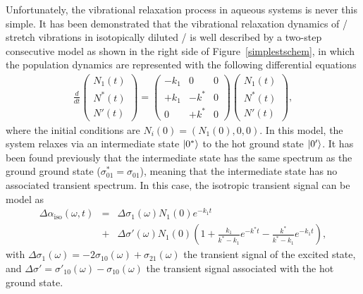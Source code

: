 Unfortunately, the vibrational relaxation process in aqueous systems is never this simple. It has been demonstrated that the vibrational relaxation dynamics of / stretch vibrations in isotopically diluted / is well described by a two-step consecutive model as shown in the right side of Figure~\ref{simplestschem},\!\cite{Rezus2005,Rezus2006} in which the population dynamics are represented with the following differential equations
\begin{eqnarray}
\frac{d}{d t} \left( \begin{array}{c} N_1 (t)\\ N^* (t) \\ N' (t) \end{array} \right) = \left( \begin{array}{ccc} -k_1 & 0 & 0 \\ +k_1 & -k^* & 0 \\ 0 & +k^* & 0 \end{array} \right)  \left( \begin{array}{c} N_1 (t) \\ N^* (t) \\ N' (t) \end{array} \right),
\label{cascademodel}
\end{eqnarray}
where the initial conditions are $N_i (0) = \left(  N_1 (0), 0 , 0   \right)$. In this model, the system relaxes via an intermediate state $\ket{0^*}$ to the hot ground state $\ket{0'}$. 
It has been found previously that the intermediate state has the same spectrum as the ground ground state ($\sigma_{01}^* = \sigma_{01}$), meaning that the intermediate state has no associated transient spectrum. In this case, the isotropic transient signal can be model as
\begin{eqnarray}
\Delta \alpha_{\text{iso}} (\omega, t) &=& \Delta\sigma_1 (\omega) N_1(0) e^{-k_1 t} \nonumber \\ &+& \Delta\sigma' (\omega) N_1(0)\left( 1 + \frac{k_1}{k^* - k_1} e^{-k^* t} - \frac{k^*}{k^* - k_1} e^{-k_1 t} \right),
\label{Solutioncascademodel}
\end{eqnarray}
with $\Delta\sigma_1 (\omega) = -2 \sigma_{10} (\omega) + \sigma_{21} (\omega)$ the transient signal of the excited state, and $\Delta\sigma' = \sigma'_{10}(\omega) - \sigma_{10} (\omega)$ the transient signal associated with the hot ground state.


